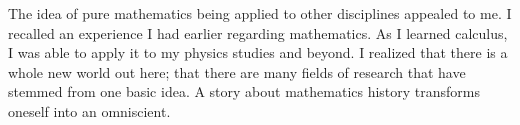 The idea of pure mathematics being applied to other disciplines appealed to me. I recalled an
experience I had earlier regarding mathematics. As I learned calculus, I was able to apply it to
my physics studies and beyond. I realized that there is a whole new world out here; that there
are many fields of research that have stemmed from one basic idea. A story about mathematics
history transforms oneself into an omniscient.

